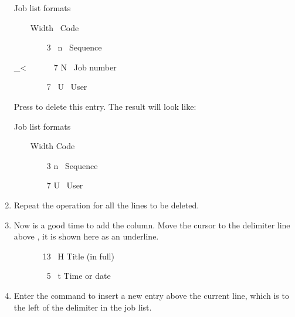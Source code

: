 \begin{enumerate}
\begin{expara}
Job list formats

\ \ \ \ Width \ Code

\ \ \ \ \ \ \ \ 3 \ n \ Sequence

{\textquotedbl} {\textquotedbl}

\_{\textless} \ \ \ \ \ \ 7 N \ Job number

{\textquotedbl} {\textquotedbl}

\ \ \ \ \ \ \ \ 7 \ U \ User

\end{expara}

Press  to delete this entry. The result will look like:

\begin{expara}
Job list formats

\ \ \ \ Width Code

\ \ \ \ \ \ \ \ 3 n \ Sequence

{\textquotedbl} {\textquotedbl}

{\textquotedbl} {\textquotedbl}

\ \ \ \ \ \ \ \ 7 U \ User

{\textquotedbl} {\textquotedbl}

\end{expara}

\item Repeat the operation for all the lines to be deleted.
\item Now is a good time to add the  column.
Move the cursor to the delimiter line above , it is shown here as an underline.

\begin{expara}

{\textquotedbl} {\textquotedbl}

\ \ \ \ \ \ \ 13 \ H Title (in full)

{\textquotedbl} {\textquotedbl}

{\textquotedbl} {\textquotedbl}

\ \ \ \ \ \ \ \ 5 \ t Time or date

{\textquotedbl} {\textquotedbl}

\end{expara}

\item Enter the  command to insert a new entry above
the current line, which is to the left of the delimiter in the job
list.

\begin{expara}


\end{expara}
\end{enumerate}
